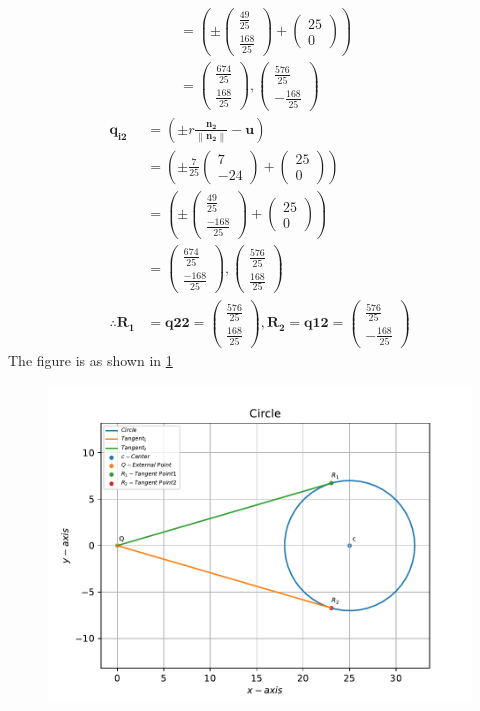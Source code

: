 \documentclass[12pt]{article}
\providecommand{\brak}[1]{\ensuremath{\left(#1\right)}}
\providecommand{\norm}[1]{\left\lVert#1\right\rVert}
\newcommand{\myvec}[1]{\ensuremath{\begin{pmatrix}#1\end{pmatrix}}}
\let\vec\mathbf
\begin{document}
\begin{enumerate}
\begin{align}
	&= \brak{\pm \myvec{\frac{49}{25} \\ \frac{168}{25}} + \myvec{25 \\ 0}} \\
	&= \myvec{\frac{674}{25} \\ \frac{168}{25}}, \myvec{\frac{576}{25} \\ -\frac{168}{25}}
\end{align}
\begin{align}
	\vec{q_{i2}} &= \brak{\pm r \frac{\vec{n_2}}{\norm{\vec{n_2}}}- \vec{u}} \\
	&= \brak{\pm \frac{7}{25}\myvec{7 \\ -24}+ \myvec{25 \\ 0}} \\
	&= \brak{\pm \myvec{\frac{49}{25} \\ \frac{-168}{25}} + \myvec{25 \\ 0}} \\
	&= \myvec{\frac{674}{25} \\ \frac{-168}{25}}, \myvec{\frac{576}{25} \\ \frac{168}{25}}  \\
	\therefore \vec{R_1} &= \vec{q{22}} = \myvec{\frac{576}{25} \\ \frac{168}{25}}, \vec{R_2} = \vec{q{12}} = \myvec{\frac{576}{25} \\ -\frac{168}{25}}
\end{align}
The figure is as shown in \ref{fig:Fig1}
\begin{figure}[!h]
	\begin{center}
		\includegraphics[width=\columnwidth]{./figs/problem1.pdf}
	\end{center}
\caption{}
\label{fig:Fig1}
\end{figure}
\end{enumerate}
\end{document}
